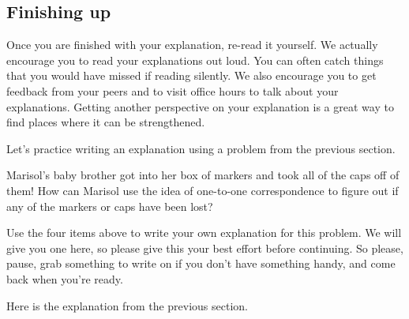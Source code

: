 \documentclass[noauthor,nooutcomes]{ximera}
\begin{document}
\subsection{Finishing up}
Once you are finished with your explanation, re-read it yourself. We actually encourage you to read your explanations out loud. You can often catch things that you would have missed if reading silently. We also encourage you to get feedback from your peers and to visit office hours to talk about your explanations. Getting another perspective on your explanation is a great way to find places where it can be strengthened.


Let's practice writing an explanation using a problem from the previous section.



\begin{problem}
Marisol's baby brother got into her box of markers and took all of the caps off of them! How can Marisol  use the idea of one-to-one correspondence to figure out if any of the markers or caps have been lost?

\begin{prompt} %
Use the four items above to write your own explanation for this problem. We will give you one here, so please give this your best effort before continuing. So please, pause, grab something to write on if you don't have something handy, and come back when you're ready.

\begin{multipleChoice}
\end{multipleChoice}
\end{prompt}


\begin{problem} 
Here is the explanation from the previous section.


\end{problem}
\end{problem}
\end{document}
